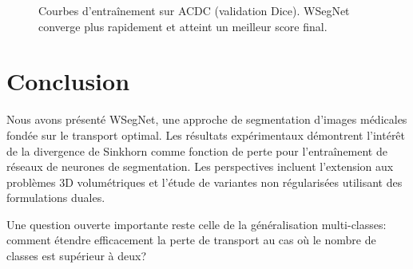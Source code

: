 \documentclass[11pt,a4paper]{article}
\theoremstyle{definition}
\begin{document}
\begin{figure}[H]
\centering
{}
\caption{Courbes d'entra\^inement sur ACDC (validation Dice).
  WSegNet converge plus rapidement et atteint un meilleur score
  final.}\label{fig:training-curves}
\end{figure}


\section{Conclusion}

Nous avons pr\'esent\'e WSegNet, une approche de segmentation d'images
m\'edicales fond\'ee sur le transport optimal. Les r\'esultats
exp\'erimentaux d\'emontrent l'int\'er\^et de la divergence de Sinkhorn
comme fonction de perte pour l'entra\^inement de r\'eseaux de neurones
de segmentation. Les perspectives incluent l'extension aux probl\`emes
3D volum\'etriques et l'\'etude de variantes non r\'egularis\'ees
utilisant des formulations duales.

Une question ouverte importante reste celle de la g\'en\'eralisation
multi-classes: comment \'etendre efficacement la perte de transport
au cas o\`u le nombre de classes est sup\'erieur \`a deux?
\end{document}

